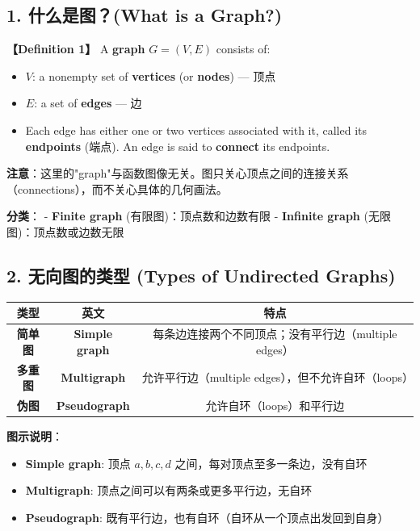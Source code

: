\documentclass[10pt,a4paper,openany]{ctexbook}
\theoremstyle{definition}
\theoremstyle{remark}
\renewenvironment{quote}
  {\list{}{\leftmargin=1em\rightmargin=0pt\topsep=0.5pt\partopsep=0pt}\item[]}
  {\endlist}
\begin{document}
\vspace{-2pt}

\subsection{1. 什么是图？(What is a Graph?)}

\textbf{【Definition 1】} A \textbf{graph} $G = (V, E)$ consists of:
\begin{itemize}
\item $V$: a nonempty set of \textbf{vertices} (or \textbf{nodes}) — 顶点
\item $E$: a set of \textbf{edges} — 边
\item Each edge has either one or two vertices associated with it, called its \textbf{endpoints} (端点). An edge is said to \textbf{connect} its endpoints.

\end{itemize}

\begin{quote}
\textbf{注意}：这里的"graph"与函数图像无关。图只关心顶点之间的连接关系（connections），而不关心具体的几何画法。

\textbf{分类}：
- \textbf{Finite graph} (有限图)：顶点数和边数有限
- \textbf{Infinite graph} (无限图)：顶点数或边数无限

\end{quote}
\vspace{-2pt}

\subsection{2. 无向图的类型 (Types of Undirected Graphs)}

\begin{center}
\begin{tabular}{ccc}
\hline
类型 & 英文 & 特点 \\ \hline
\textbf{简单图} & \textbf{Simple graph} & 每条边连接两个不同顶点；没有平行边（multiple edges） \\
\textbf{多重图} & \textbf{Multigraph} & 允许平行边（multiple edges），但不允许自环（loops） \\
\textbf{伪图} & \textbf{Pseudograph} & 允许自环（loops）和平行边 \\
\hline
\end{tabular}

\end{center}

\textbf{图示说明}：
\begin{itemize}
\item \textbf{Simple graph}: 顶点 $a,b,c,d$ 之间，每对顶点至多一条边，没有自环
\item \textbf{Multigraph}: 顶点之间可以有两条或更多平行边，无自环
\item \textbf{Pseudograph}: 既有平行边，也有自环（自环从一个顶点出发回到自身）

\end{itemize}
\end{document}
